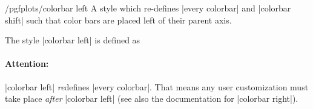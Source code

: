 \begin{stylekey}{/pgfplots/colorbar left}
	A style which re-defines |every colorbar| and |colorbar shift| such that color bars are placed left of their parent axis.
\begin{codeexample}[]
\end{codeexample}
	
	The style |colorbar left| is defined as
\begin{codeexample}
\end{codeexample}
	\paragraph{Attention:} |colorbar left| \emph{re}defines |every colorbar|. That means any user customization must take place \emph{after} |colorbar left| (see also the documentation for |colorbar right|).
\end{stylekey}


